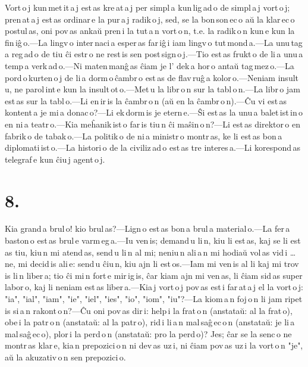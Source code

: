 \documentclass[ngerman,12pt,twoside]{book}
\begin{document}
Vort\,o\,j kun\,met\,it\,a\,j est\,as kre\,at\,a\,j per simpl\,a kun\,lig\,ad\,o de simpl\,a\,j vort\,o\,j; pren\,at\,a\,j est\,as ordinar\,e la pur\,a\,j radik\,o\,j, sed, se la bon\,son\,ec\,o aŭ la klar\,ec\,o postul\,as, oni pov\,as ankaŭ pren\,i la tut\,a\,n vort\,o\,n, t.e. la radik\,o\,n kun\,e kun la fin\,iĝ\,o.---La lingv\,o inter\,naci\,a esper\,as far\,iĝ\,i iam lingv\,o tut\,mond\,a.---La unu\,tag\,a reg\,ad\,o de tiu ĉi estr\,o ne rest\,is sen post\,sign\,o\,j.---Tio est\,as frukt\,o de li\,a unu\,a\,temp\,a verk\,ad\,o.---Ni maten\,manĝ\,as ĉiam je l' dek\,a hor\,o antaŭ tag\,mez\,o.---La pord\,o\,kurten\,o\,j de li\,a dorm\,o\,ĉambr\,o est\,as de flav\,ruĝ\,a kolor\,o.---Neniam insult\,u, ne parol\,int\,e kun la insult\,ot\,o.---Met\,u la libr\,o\,n sur la tabl\,o\,n.---La libr\,o jam est\,as sur la tabl\,o.---Li en\,ir\,is la ĉambr\,o\,n (aŭ en la ĉambr\,o\,n).---Ĉu vi est\,as kontent\,a je mi\,a donac\,o?---Li ek\,dorm\,is je etern\,e.---Ŝi est\,as la unu\,a balet\,ist\,in\,o en ni\,a teatr\,o.---Kia meĥanik\,ist\,o far\,is tiu\,n ĉi maŝin\,o\,n?---Li est\,as direktor\,o en fabrik\,o de tabak\,o.---La politik\,o de ni\,a ministr\,o montr\,as, ke li est\,as bon\,a diplomati\,ist\,o.---La histori\,o de la civiliz\,ad\,o est\,as tre interes\,a.---Li korespond\,as telegraf\,e kun ĉiu\,j agent\,o\,j. 

\section*{8.}

Kia grand\,a brul\,o! kio brul\,as?---Lign\,o est\,as bon\,a brul\,a material\,o.---La fer\,a baston\,o est\,as brul\,e varm\,eg\,a.---Iu ven\,is; demand\,u li\,n, kiu li est\,as, kaj se li est\,as tiu, kiu\,n mi atend\,as, send\,u li\,n al mi; neniu\,n ali\,a\,n mi hodiaŭ vol\,as vid\,i \ldots{} ne, mi decid\,is ali\,e: send\,u ĉiu\,n, kiu ajn li est\,os.---Iam mi ven\,is al li kaj mi trov\,is li\,n liber\,a; tio ĉi mi\,n fort\,e mir\,ig\,is, ĉar kiam ajn mi ven\,as, li ĉiam sid\,as super labor\,o, kaj li neniam est\,as liber\,a.---Kia\,j vort\,o\,j pov\,as est\,i far\,at\,a\,j el la vort\,o\,j: "ia", "ial", "iam", "ie", "iel", "ies", "io", "iom", "iu"?---La kiom\,a\,n foj\,o\,n li jam ripet\,is si\,a\,n rakont\,o\,n?---Ĉu oni pov\,as dir\,i: help\,i la frat\,o\,n (anstataŭ: al la frat\,o), obe\,i la patr\,o\,n (anstataŭ: al la patr\,o), rid\,i li\,a\,n mal\,saĝ\,ec\,o\,n (anstataŭ: je li\,a mal\,saĝ\,ec\,o), plor\,i la perd\,o\,n (anstataŭ: pro la perd\,o)? Jes; ĉar se la senc\,o ne montr\,as klar\,e, kia\,n prepozici\,o\,n ni dev\,as uz\,i, ni ĉiam pov\,as uz\,i la vort\,o\,n "je", aŭ la akuzativ\,o\,n sen prepozici\,o. 
\end{document}
